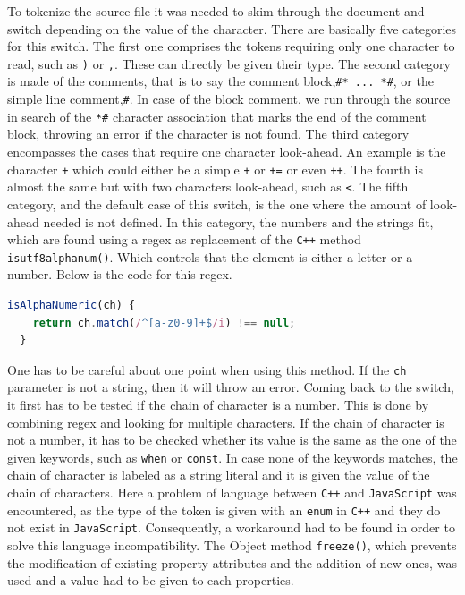 \documentclass{scrreprt}
\begin{document}
To tokenize the source file it was needed to skim through the document and switch depending on the value of the character. There are basically five categories for this switch.
The first one comprises the tokens requiring only one character to read, such as \texttt{)} or \texttt{,}. These can directly be given their type. The second category is made of the comments, that is to say the comment block,\texttt{\#* ... *\#}, or the simple line comment,\texttt{\#}. In case of the block comment,
we run through the source in search of the \texttt{*\#} character association that marks the end of the comment block, throwing an error if the character is not found. The third category encompasses the cases that require one character look-ahead.
An example is the character \texttt{+} which could either be a simple \texttt{+} or \texttt{+=} or even \texttt{++}. The fourth is almost the same but with two characters look-ahead, such as \texttt{<}. The fifth category, and the default case of this switch, is the one where the amount of look-ahead needed is not defined.
In this category, the numbers and the strings fit, which are found using a regex as replacement of the \texttt{C++} method \texttt{is\textunderscore utf8\textunderscore alpha\textunderscore num()}. Which controls that the element is either a letter or a number. Below is 
the code for this regex.

\begin{lstlisting}[language=JavaScript, gobble=2, basicstyle=\ttfamily\small]
  isAlphaNumeric(ch) {
    return ch.match(/^[a-z0-9]+$/i) !== null;
  }
\end{lstlisting}

One has to be careful about one point when using this method. If the \texttt{ch} parameter is not a string, then it will throw an error. Coming back to the switch, it first has to be tested if the chain of character is a number. This is done by combining regex and looking for multiple characters.
If the chain of character is not a number, it has to be checked whether its value is the same as the one of the given keywords, such as \texttt{when} or \texttt{const}. In case none of the keywords matches, the chain of character is labeled as a string literal and it is given the value of the chain of characters. Here a problem
of language between \texttt{C++} and \texttt{JavaScript} was encountered, as the type of the token is given with an \texttt{enum} in \texttt{C++} and they do not exist in \texttt{JavaScript}. Consequently, a workaround had to be found in order to solve this language incompatibility. The Object method \texttt{freeze()}, which prevents the modification of existing property attributes and the addition of new ones, 
was used and a value had to be given to each properties.
\end{document}
